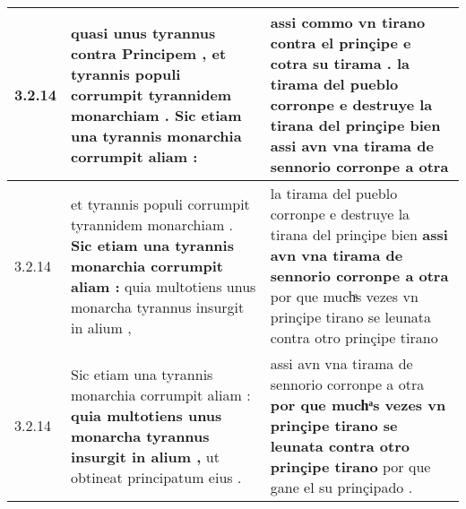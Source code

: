 \begin{tabular}{|p{1cm}|p{6.5cm}|p{6.5cm}|}
3.2.14 & quasi unus tyrannus contra Principem , \textbf{ et tyrannis populi corrumpit tyrannidem monarchiam . } Sic etiam una tyrannis monarchia corrumpit aliam : & assi commo vn tirano contra el prinçipe e cotra su tirama . \textbf{ la tirama del pueblo corronpe e destruye la tirana del prinçipe bien } assi avn vna tirama de sennorio corronpe a otra \\\hline
3.2.14 & et tyrannis populi corrumpit tyrannidem monarchiam . \textbf{ Sic etiam una tyrannis monarchia corrumpit aliam : } quia multotiens unus monarcha tyrannus insurgit in alium , & la tirama del pueblo corronpe e destruye la tirana del prinçipe bien \textbf{ assi avn vna tirama de sennorio corronpe a otra } por que muchͣs vezes vn prinçipe tirano se leunata contra otro prinçipe tirano \\\hline
3.2.14 & Sic etiam una tyrannis monarchia corrumpit aliam : \textbf{ quia multotiens unus monarcha tyrannus insurgit in alium , } ut obtineat principatum eius . & assi avn vna tirama de sennorio corronpe a otra \textbf{ por que muchͣs vezes vn prinçipe tirano se leunata contra otro prinçipe tirano } por que gane el su prinçipado . \\\hline

\end{tabular}
